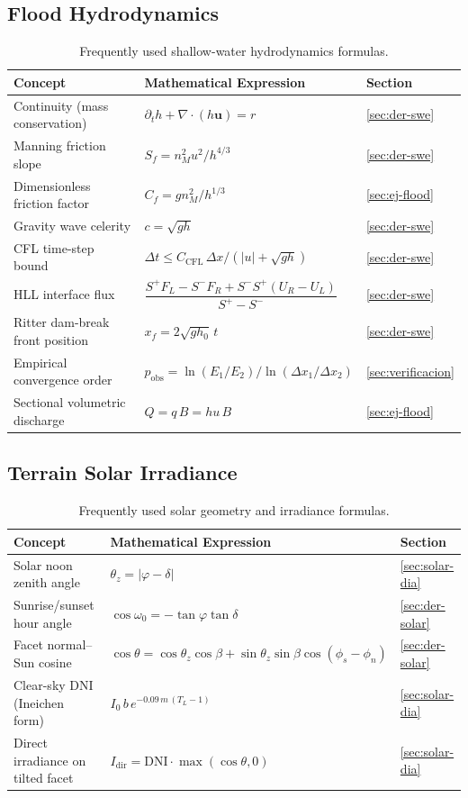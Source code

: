 \documentclass[11pt,a4paper]{article}
\begin{document}
\subsection*{Flood Hydrodynamics}
\begin{table}[htbp]
\centering
\caption{Frequently used shallow-water hydrodynamics formulas.}
\label{tab:formulas-flood}
\small
\begin{tabularx}{\linewidth}{@{}lXl@{}}
\toprule
Concept & Mathematical Expression & Section \\
\midrule
Continuity (mass conservation) & $\partial_th+\nabla\!\cdot(h\mathbf u)=r$ & \ref{sec:der-swe} \\
Manning friction slope & $S_f=n_M^2u^2/h^{4/3}$ & \ref{sec:der-swe} \\
Dimensionless friction factor & $C_f=gn_M^2/h^{1/3}$ & \ref{sec:ej-flood} \\
Gravity wave celerity & $c=\sqrt{gh}$ & \ref{sec:der-swe} \\
CFL time-step bound & $\Delta t\le C_{\mathrm{CFL}}\,\Delta x/(|u|+\sqrt{gh})$ & \ref{sec:der-swe} \\
HLL interface flux & $\dfrac{S^+F_L-S^-F_R+S^-S^+(U_R-U_L)}{S^+-S^-}$ & \ref{sec:der-swe} \\
Ritter dam-break front position & $x_f=2\sqrt{gh_0}\,t$ & \ref{sec:der-swe} \\
Empirical convergence order & $p_{\mathrm{obs}}=\ln(E_1/E_2)/\ln(\Delta x_1/\Delta x_2)$ & \ref{sec:verificacion} \\
Sectional volumetric discharge & $Q=q\,B=hu\,B$ & \ref{sec:ej-flood} \\
\bottomrule
\end{tabularx}
\end{table}

\subsection*{Terrain Solar Irradiance}
\begin{table}[htbp]
\centering
\caption{Frequently used solar geometry and irradiance formulas.}
\label{tab:formulas-solar}
\small
\begin{tabularx}{\linewidth}{@{}lXl@{}}
\toprule
Concept & Mathematical Expression & Section \\
\midrule
Solar noon zenith angle & $\theta_z=|\varphi-\delta|$ & \ref{sec:solar-dia} \\
Sunrise/sunset hour angle & $\cos\omega_0=-\tan\varphi\tan\delta$ & \ref{sec:der-solar} \\
Facet normal--Sun cosine & $\cos\theta=\cos\theta_z\cos\beta+\sin\theta_z\sin\beta\cos(\phi_s-\phi_n)$ & \ref{sec:der-solar} \\
Clear-sky DNI (Ineichen form) & $I_0\,b\,e^{-0.09\,m\,(T_L-1)}$ & \ref{sec:solar-dia} \\
Direct irradiance on tilted facet & $I_{\mathrm{dir}} = \mathrm{DNI}\cdot\max(\cos\theta,0)$ & \ref{sec:solar-dia} \\
\bottomrule
\end{tabularx}
\end{table}
\end{document}
